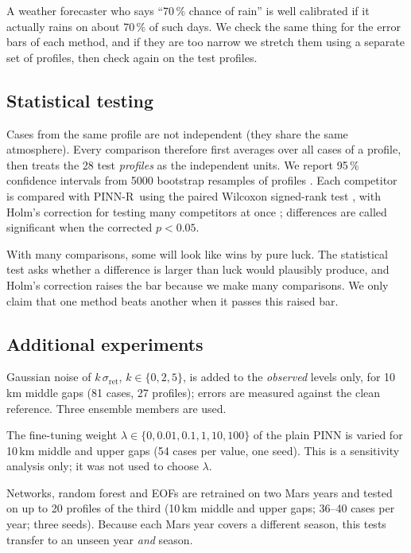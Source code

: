 \documentclass[11pt,a4paper]{article}
\newcommand{\ours}{PINN-R}
\begin{document}
\begin{plainbox}
A weather forecaster who says ``70\,\% chance of rain'' is well calibrated if it actually rains on about 70\,\% of such days. We check the same thing for the error bars of each method, and if they are too narrow we stretch them using a separate set of profiles, then check again on the test profiles.
\end{plainbox}

\subsection{Statistical testing}
Cases from the same profile are not independent (they share the same atmosphere). Every comparison therefore first averages over all cases of a profile, then treats the 28 test \emph{profiles} as the independent units. We report 95\,\% confidence intervals from 5000 bootstrap resamples of profiles \citep{efron1979}. Each competitor is compared with \ours\ using the paired Wilcoxon signed-rank test \citep{wilcoxon1945}, with Holm's correction for testing many competitors at once \citep{holm1979}; differences are called significant when the corrected $p<0.05$.

\begin{plainbox}
With many comparisons, some will look like wins by pure luck. The statistical test asks whether a difference is larger than luck would plausibly produce, and Holm's correction raises the bar because we make many comparisons. We only claim that one method beats another when it passes this raised bar.
\end{plainbox}

\subsection{Additional experiments}
\begin{description}[leftmargin=0.6cm,style=nextline]
\item[E2: Noise robustness.] Gaussian noise of $k\,\sigma_{\mathrm{ret}}$, $k\in\{0,2,5\}$, is added to the \emph{observed} levels only, for 10\,km middle gaps (81 cases, 27 profiles); errors are measured against the clean reference. Three ensemble members are used.
\item[E3: Physics-weight sensitivity.] The fine-tuning weight $\lambda\in\{0,0.01,0.1,1,10,100\}$ of the plain PINN is varied for 10\,km middle and upper gaps (54 cases per value, one seed). This is a sensitivity analysis only; it was not used to choose $\lambda$.
\item[E4: Mars-year hold-out.] Networks, random forest and EOFs are retrained on two Mars years and tested on up to 20 profiles of the third (10\,km middle and upper gaps; 36--40 cases per year; three seeds). Because each Mars year covers a different season, this tests transfer to an unseen year \emph{and} season.
\end{description}
\end{document}
